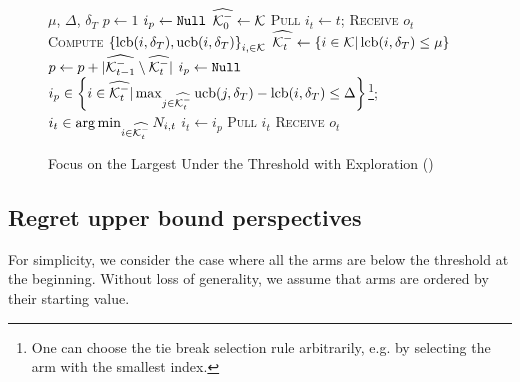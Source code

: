 \begin{figure*}[ht]
\begin{minipage}{\textwidth}
\renewcommand*\footnoterule{}
\begin{savenotes}
\begin{algorithm}[H]
\caption{Focus on the Largest Under the Threshold with Exploration (\FLUTE)}
\label{alg:flute}
\begin{algorithmic}[1]
\Require $\mu$, $\Delta$, $\delta_T$
\State $p \leftarrow 1$
\State $i_p \leftarrow \texttt{Null}$ 
\State $\widehat{\mathcal{K}_{0}^-} \leftarrow \mathcal{K}$
	\State \textsc{Pull}  $i_t \gets t$; \textsc{Receive} $o_{t}$
\EndFor
{}
		\State \textsc{Compute} $\left\{\normalfont\operatorname{lcb}(i,\delta_T), \normalfont\operatorname{ucb}(i,\delta_T)\right\}_{i,\in \mathcal{K}}$ {\footnotesize {}}
		\State $\widehat{\mathcal{K}_t^-} \leftarrow \left\{i \in \mathcal{K} | \normalfont\operatorname{lcb}(i,\delta_T) \leq \mu \right\}$\label{algline:flute-armsbelow}
		\State $p \leftarrow p + | \widehat{\mathcal{K}_{t-1}^-} \setminus \widehat{\mathcal{K}_t^-}|$ 	\label{algline:flute-phase-increase}
		\label{algline:flute-phase-cond}
		\State $i_p \leftarrow \texttt{Null}$ 
	\EndIf
	\State $i_p \in \left\{i \in \widehat{\mathcal{K}_t^-} | \max_{j \in \widehat{\mathcal{K}_t^-}} \normalfont\operatorname{ucb}(j,\delta_T) - \normalfont\operatorname{lcb}(i,\delta_T) \leq \Delta\right\}$\footnote{One can choose the tie break selection rule arbitrarily, e.g. by selecting the arm with the smallest index.};\label{algline:flute-ip-select}
	\EndIf
	\State $i_t \in \operatorname*{arg\,min}_{i \in \widehat{\mathcal{K}_t^-}} N_{i,t}$\label{algline:flute-pull-it}
	\Else 
	\State $i_t \leftarrow i_p$ \label{algline:flute-pull-ip}
	\EndIf
	\State \textsc{Pull} $i_t $ \textsc{Receive} $o_{t}$
\EndFor
\end{algorithmic}
\end{algorithm}
\end{savenotes}
\end{minipage}
\end{figure*}



\subsection{Regret upper bound perspectives}
For simplicity, we consider the case where all the arms are below the threshold at the beginning. Without loss of generality, we assume that arms are ordered by their starting value. 

